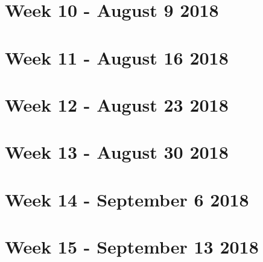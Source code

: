 \documentclass[a4paper]{report}
\begin{document}
\chapter{Week 10 - August 9 2018}


\chapter{Week 11 - August 16 2018}


\chapter{Week 12 - August 23 2018}


\chapter{Week 13 - August 30 2018}


\chapter{Week 14 - September 6 2018}


\chapter{Week 15 - September 13 2018}



\end{document}
